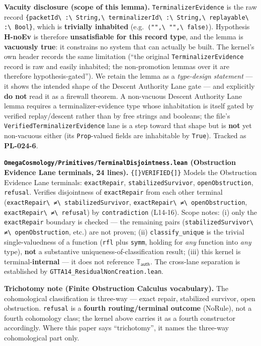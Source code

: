 \documentclass[
  10pt,
]{article}
\renewenvironment{quote}
  {\begin{leftbar}\small}
  {\end{leftbar}}
\DeclareRobustCommand{\texttt}[1]{{\paperSymbolFont\nolinkurl{#1}}}
\begin{document}
\begin{quote}
\textbf{Vacuity disclosure (scope of this lemma).} \texttt{TerminalizerEvidence} is the raw record \texttt{\{packetId\ :\ String,\ terminalizerId\ :\ String,\ replayable\ :\ Bool\}}, which is \textbf{trivially inhabited} (e.g.~\texttt{⟨"",\ "",\ false⟩}). Hypothesis \textbf{H-noEv} is therefore \textbf{unsatisfiable for this record type}, and the lemma is \textbf{vacuously true}: it constrains no system that can actually be built. The kernel's own header records the same limitation (``the original \texttt{TerminalizerEvidence} record is raw and easily inhabited; the non-promotion lemmas over it are therefore hypothesis-gated''). We retain the lemma as a \emph{type-design statement} --- it shows the intended shape of the Descent Authority Lane gate --- and explicitly \textbf{do not} read it as a firewall theorem. A non-vacuous Descent Authority Lane lemma requires a terminalizer-evidence type whose inhabitation is itself gated by verified replay/descent rather than by free strings and booleans; the file's \texttt{VerifiedTerminalizerEvidence} lane is a step toward that shape but is \textbf{not} yet non-vacuous either (its \texttt{Prop}-valued fields are inhabitable by \texttt{True}). Tracked as \textbf{PL-024-6}.
\end{quote}

\textbf{\texttt{OmegaCosmology/Primitives/TerminalDisjointness.lean} (Obstruction Evidence Lane terminals, 24 lines).} \texttt{{[}VERIFIED{]}} Models the Obstruction Evidence Lane terminals: \texttt{exactRepair}, \texttt{stabilizedSurvivor}, \texttt{openObstruction}, \texttt{refusal}. Verifies disjointness of \texttt{exactRepair} from each other terminal (\texttt{exactRepair\ ≠\ stabilizedSurvivor}, \texttt{exactRepair\ ≠\ openObstruction}, \texttt{exactRepair\ ≠\ refusal}) by \texttt{contradiction} (L14-16). Scope notes: (i) only the \texttt{exactRepair} boundary is checked --- the remaining pairs (\texttt{stabilizedSurvivor\ ≠\ openObstruction}, etc.) are not proven; (ii) \texttt{classify\_unique} is the trivial single-valuedness of a function (\texttt{rfl} plus \texttt{symm}, holding for \emph{any} function into \emph{any} type), \textbf{not} a substantive uniqueness-of-classification result; (iii) this kernel is terminal-\textbf{internal} --- it does not reference \protect\hypertarget{math-E0029-0083}{}{\(\mathbb{T}_{\mathsf{auth}}\)}. The cross-lane separation is established by \texttt{GTTA14\_ResidualNonCreation.lean}.

\begin{quote}
\textbf{Trichotomy note (Finite Obstruction Calculus vocabulary).} The cohomological classification is three-way --- exact repair, stabilized survivor, open obstruction. \texttt{refusal} is a \textbf{fourth routing/terminal outcome} (NoRule), not a fourth cohomology class; the kernel above carries it as a fourth constructor accordingly. Where this paper says ``trichotomy'', it names the three-way cohomological part only.
\end{quote}
\end{document}
